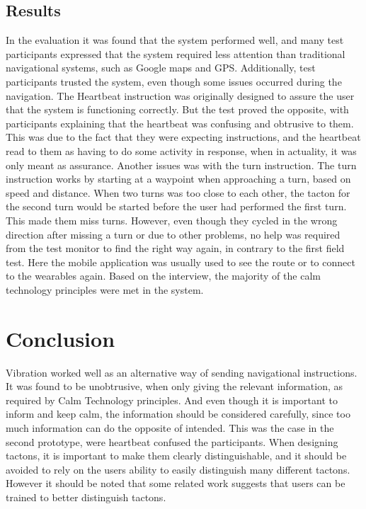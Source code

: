\documentclass{sigchi}
\begin{document}
\subsection{Results}
In the evaluation it was found that the system performed well, and many test participants expressed that the system required less attention than traditional navigational systems, such as Google maps and GPS. 
\newline
\newline
Additionally, test participants trusted the system, even though some issues occurred during the navigation. The Heartbeat instruction was originally designed to assure the user that the system is functioning correctly. But the test proved the opposite, with participants explaining that the heartbeat was confusing and obtrusive to them. This was due to the fact that they were expecting instructions, and the heartbeat read to them as having to do some activity in response, when in actuality, it was only meant as assurance.
\newline
Another issues was with the turn instruction. The turn instruction works by starting at a waypoint when approaching a turn, based on speed and distance. When two turns was too close to each other, the tacton for the second turn would be started before the user had performed the first turn. This made them miss turns.
\newline
\newline 
However, even though they cycled in the wrong direction after missing a turn or due to other problems, no help was required from the test monitor to find the right way again, in contrary to the first field test.  Here the mobile application was usually used to see the route or to connect to the wearables again. 
\newline
Based on the interview, the majority of the calm technology principles were met in the system. 
\section{Conclusion}
Vibration worked well as an alternative way of sending navigational instructions. It was found to be unobtrusive, when only giving the relevant information, as required by Calm Technology principles. 
And even though it is important to inform and keep calm, the information should be considered carefully, since too much information can do the opposite of intended. This was the case in the second prototype, were heartbeat confused the participants. When designing tactons, it is important to make them clearly distinguishable, and it should be avoided to rely on the users ability to easily distinguish many different tactons. However it should be noted that some related work suggests that users can be trained to better distinguish tactons. 
 
\end{document}
